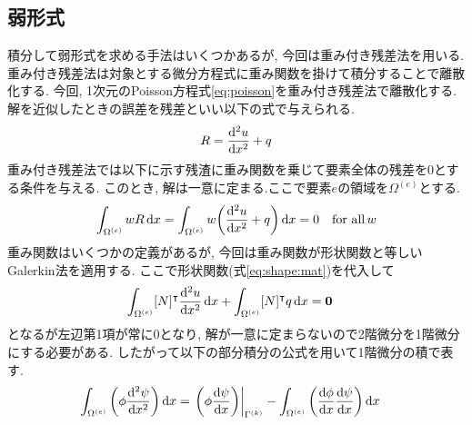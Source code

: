 \documentclass[paper=a4]{jlreq}
\begin{document}
\subsection{弱形式}
積分して弱形式を求める手法はいくつかあるが, 今回は重み付き残差法を用いる.
重み付き残差法は対象とする微分方程式に重み関数を掛けて積分することで離散化する.
今回, 1次元のPoisson方程式\eqref{eq:poisson}を重み付き残差法で離散化する.
解を近似したときの誤差を残差といい以下の式で与えられる.
\begin{align}
    R = \dv[2]{u}{x} +q    \label{eq:residal}
\end{align}
重み付き残差法では以下に示す残渣に重み関数を乗じて要素全体の残差を0とする条件を与える.
このとき, 解は一意に定まる.ここで要素$e$の領域を$\Omega^{(e)}$とする.
\begin{align}
    \int_{\Omega^{(e)}} wR\dd{x} = \int_{\Omega^{(e)}} w\qty( \dv[2]{u}{x} + q)\dd{x} = 0\quad
    \text{for all}\,w
    \label{eq:weighted-residual}
\end{align}
重み関数はいくつかの定義があるが, 
今回は重み関数が形状関数と等しいGalerkin法を適用する.
ここで形状関数(式\eqref{eq:shape:mat})を代入して
\begin{align}
    \int_{\Omega^{(e)}} [N]^\intercal \dv[2]{u}{x}\dd{x}
    + \int_{\Omega^{(e)}} [N]^\intercal q\dd{x} & = \vb*{0} \label{eq:galerkin}
\end{align}
となるが左辺第1項が常に0となり, 
解が一意に定まらないので2階微分を1階微分にする必要がある.
したがって以下の部分積分の公式を用いて1階微分の積で表す.
\begin{align}
    \int_{\Omega^{(e)}} \qty(\phi\dv[2]{\psi}{x}) \dd{x} &=
    \eval{\qty(\phi\dv{\psi}{x})}_{\Gamma^{(k)}}
    - \int_{\Omega^{(e)}} \qty(\dv{\phi}{x}\dv{\psi}{x}) \dd{x}
    \label{eq:gauss-green:theorem}
\end{align}
\end{document}
